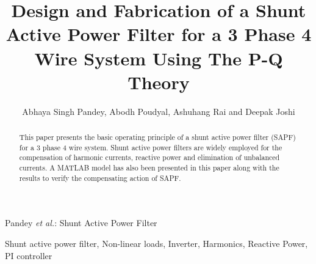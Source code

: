 \documentclass[journal,twoside]{IEEEtran}
\begin{document}
    \setcounter{page}{28}
    \title{Design and Fabrication of a Shunt Active Power Filter for a 3 Phase 4 Wire System Using The P-Q Theory}
    \author{{Abhaya Singh Pandey, Abodh Poudyal, Ashuhang Rai and Deepak Joshi}\\
  }

%
{Pandey \MakeLowercase{\textit{et al.}}: Shunt Active Power Filter}

\maketitle

\begin{abstract}
This paper presents the basic operating principle of a shunt active power filter (SAPF) for a 3 phase 4 wire system. Shunt active power filters are widely employed for the compensation of harmonic currents, reactive power and elimination of unbalanced currents. A MATLAB model has also been presented in this paper along with the results to verify the compensating action of SAPF.
\end{abstract}


	\begin{IEEEkeywords}
Shunt active power filter, Non-linear loads, Inverter, Harmonics, Reactive Power, PI controller
	\end{IEEEkeywords}
\end{document}
